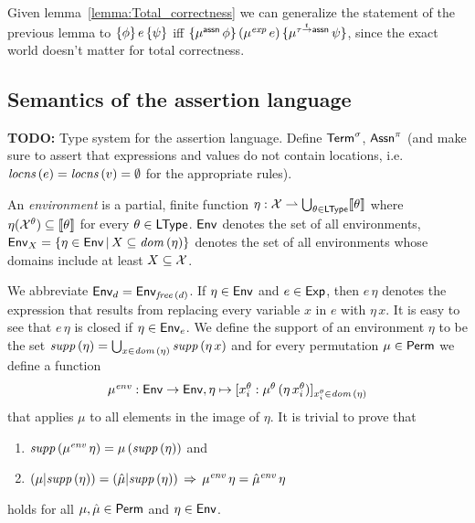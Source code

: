 \documentclass[12pt,a4paper]{report}
\newcommand{\sexp}{\nstyle{exp}}
\newcommand{\senv}{\nstyle{env}}
\begin{document}
Given lemma~\ref{lemma:Total_correctness} we can generalize the statement of the previous lemma
to $\{\phi\}\,e\,\{\psi\}$ iff $\triple{\mu^\tassn\,\phi}{(\mu^\sexp\,e)}{\mu^{\ttarrow{\tau}{\tassn}}\,\psi}$,
since the exact world doesn't matter for total correctness.



\subsection{Semantics of the assertion language}

{\bf TODO:} Type system for the assertion language. Define $\mathsf{Term}^\sigma$, $\mathsf{Assn}^\pi$ (and make sure
to assert that expressions and values do not contain locations, i.e. $\mathit{locns}\,(e) = \mathit{locns}\,(v) = \emptyset$
for the appropriate rules).

\begin{definition}[Environment] \label{definition:Environment}
  An {\em environment} is a partial, finite function $\eta: \mathcal{X} \rightharpoonup \bigcup_{\theta\in\mathsf{LType}} \llbracket\theta\rrbracket$
  where $\eta(\mathcal{X}^\theta) \subseteq \llbracket\theta\rrbracket$ for every $\theta \in \mathsf{LType}$. $\mathsf{Env}$ denotes
  the set of all environments, $\mathsf{Env}_X = \{\eta\in\mathsf{Env}\,|\,X \subseteq \mathit{dom}\,(\eta)\}$ denotes the set of
  all environments whose domains include at least $X \subseteq \mathcal{X}$.
\end{definition}

We abbreviate $\mathsf{Env}_d = \mathsf{Env}_{\mathit{free}\,(d)}$. If $\eta \in \mathsf{Env}$ and $e \in \mathsf{Exp}$, then $e\,\eta$ denotes
the expression that results from replacing every variable $x$ in $e$ with $\eta\,x$. It is
easy to see that $e\,\eta$ is closed if $\eta \in \mathsf{Env}_e$. We define the support of an environment $\eta$
to be the set $\mathit{supp}\,(\eta) = \bigcup_{x\in\mathit{dom}\,(\eta)} \mathit{supp}\,(\eta\,x)$ and for every permutation
$\mu\in\mathsf{Perm}$ we define a function
\[\begin{array}{c}
  \mu^\senv: \Env \to \Env, \eta \mapsto [x^\theta_i: \mu^\theta\,(\eta\,x^\theta_i)]_{x^\theta_i\in\dom{\eta}}
\end{array}\]
that applies $\mu$ to all elements in the image of $\eta$. It is trivial to prove that
\begin{enumerate}
  \item $\supp{\mu^\senv\,\eta} = \mu\,(\supp{\eta})$ and
  \item $(\mu|\supp{\eta}) = (\hat{\mu}|\supp{\eta}) \,\Rightarrow\, \mu^\senv\,\eta = \hat{\mu}^\senv\,\eta$
\end{enumerate}
holds for all $\mu,\hat{\mu}\in\mathsf{Perm}$ and $\eta\in\mathsf{Env}$.
\end{document}
